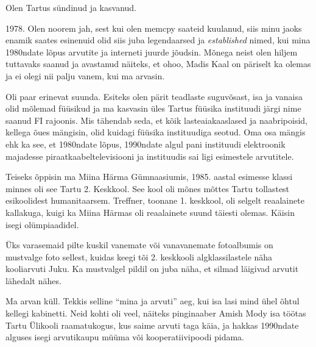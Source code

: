 

Olen Tartus sündinud ja kasvanud. 


1978. Olen noorem jah, sest kui olen memcpy saateid kuulanud, siis minu jaoks 
enamik saates esinenuid olid siis juba legendaarsed ja \emph{established} nimed, kui 
mina 1980ndate lõpus arvutite ja interneti juurde jõudsin. Mõnega neist olen hiljem tuttavaks saanud ja avastanud näiteks, 
et ohoo, Madis Kaal on päriselt ka olemas 
ja ei olegi nii palju vanem, kui ma arvasin.


Oli paar erinevat suunda. Esiteks olen pärit teadlaste 
suguvõsast, isa ja vanaisa olid mõlemad füüsikud ja ma kasvasin üles 
Tartus füüsika instituudi järgi nime saanud FI rajoonis. Mis 
tähendab seda, et kõik lasteaiakaaslased ja naabripoisid, kellega õues 
mängisin, olid kuidagi füüsika instituudiga seotud. Oma osa mängis ehk ka see, et 1980ndate lõpus, 1990ndate algul pani instituudi elektroonik majadesse piraatkaabeltelevisiooni ja 
instituudis sai ligi esimestele arvutitele. 

Teiseks õppisin ma Miina Härma Gümnaasiumis, 1985. aastal esimesse klassi minnes oli see Tartu 2. 
Keskkool. See kool 
oli mõnes mõttes Tartu tollastest esikoolidest humanitaarsem. 
Treffner, toonane 1. keskkool, oli 
selgelt reaalainete kallakuga, kuigi ka Miina Härmas oli 
reaalainete suund täiesti olemas. Käisin isegi olümpiaadidel. 

Üks varasemaid pilte kuskil vanemate või vanavanemate fotoalbumis 
on mustvalge foto sellest, kuidas keegi tõi 2. keskkooli 
algklassilastele näha kooliarvuti Juku. Ka mustvalgel pildil 
on juba näha, et silmad läigivad arvutit lähedalt nähes.


Ma arvan küll. Tekkis selline \enquote{mina ja arvuti} aeg, kui isa 
lasi mind ühel õhtul kellegi kabinetti. Neid kohti oli veel, 
näiteks pinginaaber Amish Mody isa töötas Tartu Ülikooli raamatukogus, kus saime arvuti taga käia, ja hakkas 1990ndate alguses 
isegi arvutikaupu müüma või kooperatiivipoodi pidama. 

